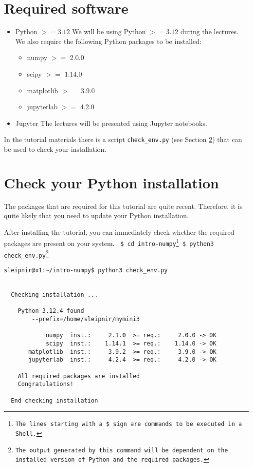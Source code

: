 \documentclass[11pt]{article}
\begin{document}
\section{Required software}
\begin{itemize}
  \item Python $>=3.12$ \newline
        We will be using Python $>=3.12$ during the lectures.
        We also require the following Python packages to be installed:
        \begin{itemize}
           \item numpy $>=$ 2.0.0 
           \item scipy $>=$ 1.14.0
           \item matplotlib $>=$ 3.9.0
           \item jupyterlab $>=$ 4.2.0
        \end{itemize} 

  \item Jupyter \newline
        The lectures will be presented using Jupyter notebooks.
\end{itemize}

In the tutorial materials there is a script \texttt{check\_env.py} 
(see Section \ref{section:check}) that can be used to check your installation.


\section{Check your Python installation}\label{section:check}
The packages that are required for this tutorial are quite recent.
Therefore, it is quite likely that you need to update your Python installation.

After installing the tutorial, you can immediately check whether the required packages 
are present on your system. \newline\newline
\texttt{
\$ cd intro-numpy\footnote{The lines starting with a \$ sign are commands to be executed in a Shell.} \newline
\$ python3 check\_env.py\footnote{The output generated by this command will be dependent on the installed version of Python and the required packages.}\newline
}

\begin{verbatim}
sleipnir@x1:~/intro-numpy$ python3 check_env.py


  Checking installation ...

    Python 3.12.4 found
        --prefix=/home/sleipnir/mymini3

            numpy  inst.:     2.1.0  >= req.:     2.0.0 -> OK 
            scipy  inst.:    1.14.1  >= req.:    1.14.0 -> OK 
       matplotlib  inst.:     3.9.2  >= req.:     3.9.0 -> OK 
       jupyterlab  inst.:     4.2.4  >= req.:     4.2.0 -> OK 

    All required packages are installed
    Congratulations!

  End checking installation
\end{verbatim}  
\end{document}
